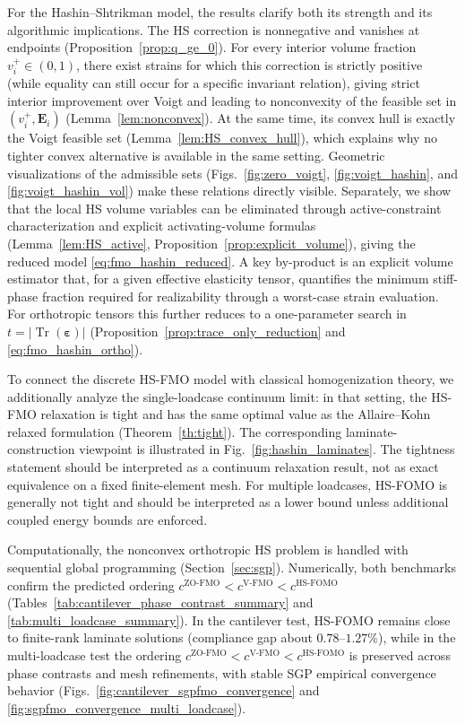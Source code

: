 \documentclass[preprint,3p]{elsarticle}
\newcommand{\tenss}[1]{\bm{\mathbf{#1}}}            %
\newcommand{\tensf}[1]{\bm{\mathbf{#1}}}            %
\newcommand{\strain}{\tenss{\varepsilon}}           %
\newcommand{\Ei}{\tensf{E}_i}                       %
\newcommand{\Tr}{\operatorname{Tr}}
\begin{document}
For the Hashin--Shtrikman model, the results clarify both its strength and its algorithmic implications. The HS correction is nonnegative and vanishes at endpoints (Proposition~\ref{prop:q_ge_0}). For every interior volume fraction $v_i^+\in(0,1)$, there exist strains for which this correction is strictly positive (while equality can still occur for a specific invariant relation), giving strict interior improvement over Voigt and leading to nonconvexity of the feasible set in $(v_i^+,\Ei)$ (Lemma~\ref{lem:nonconvex}). At the same time, its convex hull is exactly the Voigt feasible set (Lemma~\ref{lem:HS_convex_hull}), which explains why no tighter convex alternative is available in the same setting. Geometric visualizations of the admissible sets (Figs.~\ref{fig:zero_voigt}, \ref{fig:voigt_hashin}, and \ref{fig:voigt_hashin_vol}) make these relations directly visible. Separately, we show that the local HS volume variables can be eliminated through active-constraint characterization and explicit activating-volume formulas (Lemma~\ref{lem:HS_active}, Proposition~\ref{prop:explicit_volume}), giving the reduced model \eqref{eq:fmo_hashin_reduced}. A key by-product is an explicit volume estimator that, for a given effective elasticity tensor, quantifies the minimum stiff-phase fraction required for realizability through a worst-case strain evaluation. For orthotropic tensors this further reduces to a one-parameter search in $t=\lvert\Tr(\strain)\rvert$ (Proposition~\ref{prop:trace_only_reduction} and \eqref{eq:fmo_hashin_ortho}).

To connect the discrete HS-FMO model with classical homogenization theory, we additionally analyze the single-loadcase continuum limit: in that setting, the HS-FMO relaxation is tight and has the same optimal value as the Allaire--Kohn relaxed formulation (Theorem~\ref{th:tight}). The corresponding laminate-construction viewpoint is illustrated in Fig.~\ref{fig:hashin_laminates}. The tightness statement should be interpreted as a continuum relaxation result, not as exact equivalence on a fixed finite-element mesh. For multiple loadcases, HS-FOMO is generally not tight and should be interpreted as a lower bound unless additional coupled energy bounds are enforced.

Computationally, the nonconvex orthotropic HS problem is handled with sequential global programming (Section~\ref{sec:sgp}). Numerically, both benchmarks confirm the predicted ordering $c^{\mathrm{ZO\text{-}FMO}}<c^{\mathrm{V\text{-}FMO}}<c^{\mathrm{HS\text{-}FOMO}}$ (Tables~\ref{tab:cantilever_phase_contrast_summary} and \ref{tab:multi_loadcase_summary}). In the cantilever test, HS-FOMO remains close to finite-rank laminate solutions (compliance gap about $0.78$--$1.27\%$), while in the multi-loadcase test the ordering $c^{\mathrm{ZO\text{-}FMO}}<c^{\mathrm{V\text{-}FMO}}<c^{\mathrm{HS\text{-}FOMO}}$ is preserved across phase contrasts and mesh refinements, with stable SGP empirical convergence behavior (Figs.~\ref{fig:cantilever_sgpfmo_convergence} and \ref{fig:sgpfmo_convergence_multi_loadcase}).
\end{document}
